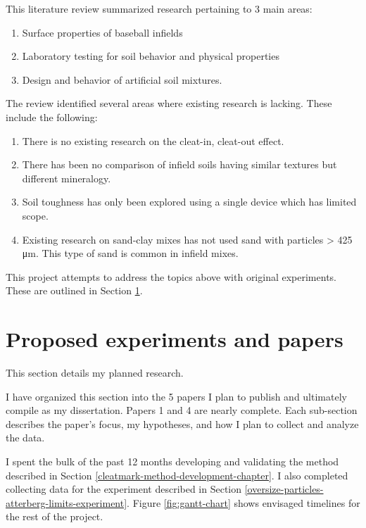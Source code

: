 \documentclass[
  letterpaper,
  openany]{book}
\providecommand{\tightlist}{%
  \setlength{\itemsep}{0pt}\setlength{\parskip}{0pt}}
\begin{document}
This literature review summarized research pertaining to 3 main areas:

\begin{enumerate}
\def\labelenumi{\arabic{enumi}.}
\tightlist
\item
  Surface properties of baseball infields
\item
  Laboratory testing for soil behavior and physical properties
\item
  Design and behavior of artificial soil mixtures.
\end{enumerate}

The review identified several areas where existing research is lacking. These include the following:

\begin{enumerate}
\def\labelenumi{\arabic{enumi}.}
\tightlist
\item
  There is no existing research on the cleat-in, cleat-out effect.
\item
  There has been no comparison of infield soils having similar textures but different mineralogy.
\item
  Soil toughness has only been explored using a single device which has limited scope.
\item
  Existing research on sand-clay mixes has not used sand with particles \textgreater{} 425 μm. This type of sand is common in infield mixes.
\end{enumerate}

This project attempts to address the topics above with original experiments.
These are outlined in Section \ref{proposed-experiments}.

\hypertarget{proposed-experiments}{%
\chapter{Proposed experiments and papers}\label{proposed-experiments}}

This section details my planned research.

I have organized this section into the 5 papers I plan to publish and ultimately compile as my dissertation.
Papers 1 and 4 are nearly complete.
Each sub-section describes the paper's focus, my hypotheses, and how I plan to collect and analyze the data.

I spent the bulk of the past 12 months developing and validating the method described in Section \ref{cleatmark-method-development-chapter}.
I also completed collecting data for the experiment described in Section \ref{oversize-particles-atterberg-limits-experiment}.
Figure \ref{fig:gantt-chart} shows envisaged timelines for the rest of the project.
\end{document}
